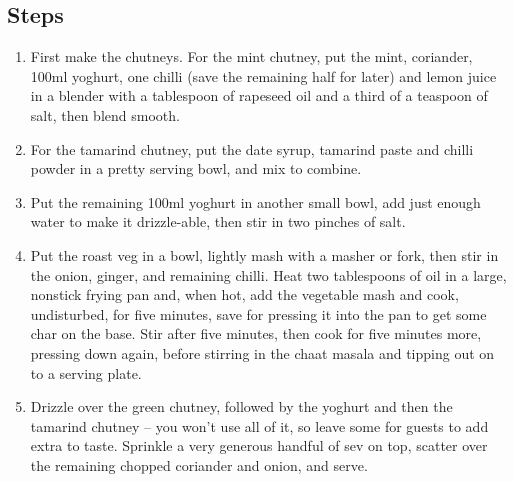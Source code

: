 \documentclass{book}
\begin{document}
\subsection*{Steps}
\begin{enumerate}
\item First make the chutneys. For the mint chutney, put the mint, coriander, 100ml yoghurt, one chilli (save the remaining half for later) and lemon juice in a blender with a tablespoon of rapeseed oil and a third of a teaspoon of salt, then blend smooth.
\item For the tamarind chutney, put the date syrup, tamarind paste and chilli powder in a pretty serving bowl, and mix to combine.
\item Put the remaining 100ml yoghurt in another small bowl, add just enough water to make it drizzle-able, then stir in two pinches of salt.
\item Put the roast veg in a bowl, lightly mash with a masher or fork, then stir in the onion, ginger, and remaining chilli. Heat two tablespoons of oil in a large, nonstick frying pan and, when hot, add the vegetable mash and cook, undisturbed, for five minutes, save for pressing it into the pan to get some char on the base. Stir after five minutes, then cook for five minutes more, pressing down again, before stirring in the chaat masala and tipping out on to a serving plate.
\item Drizzle over the green chutney, followed by the yoghurt and then the tamarind chutney – you won’t use all of it, so leave some for guests to add extra to taste. Sprinkle a very generous handful of sev on top, scatter over the remaining chopped coriander and onion, and serve.
\end{enumerate}
\newpage
\end{document}

